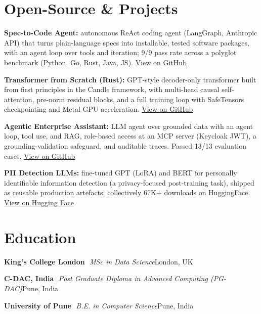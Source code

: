 \documentclass[10pt,a4paper]{article}
\newcommand{\sep}{\,\textcolor{accent!60}{\textbar}\,}
\begin{document}
\section{Open-Source \& Projects}
\begin{tight}
  \item \textbf{Spec-to-Code Agent:} autonomous ReAct coding agent (LangGraph, Anthropic API) that turns plain-language specs into installable, tested software packages, with an agent loop over tools and iteration; 9/9 pass rate across a polyglot benchmark (Python, Go, Rust, Java, JS). \href{https://github.com/abhijeetscode/Spec-to-Code-Agent}{View on GitHub}
  \item \textbf{Transformer from Scratch (Rust):} GPT-style decoder-only transformer built from first principles in the Candle framework, with multi-head causal self-attention, pre-norm residual blocks, and a full training loop with SafeTensors checkpointing and Metal GPU acceleration. \href{https://github.com/abhijeetscode/transformer-rust}{View on GitHub}
  \item \textbf{Agentic Enterprise Assistant:} LLM agent over grounded data with an agent loop, tool use, and RAG, role-based access at an MCP server (Keycloak JWT), a grounding-validation safeguard, and auditable traces. Passed 13/13 evaluation cases. \href{https://github.com/abhijeetscode/Agentic-Enterprise-Assistant}{View on GitHub}
  \item \textbf{PII Detection LLMs:} fine-tuned GPT (LoRA) and BERT for personally identifiable information detection (a privacy-focused post-training task), shipped as reusable production artefacts; collectively 67K+ downloads on HuggingFace. \href{https://huggingface.co/ab-ai/pii_model}{View on Hugging Face}
\end{tight}

\section{Education}
{\color{company}\bfseries King's College London} \sep {\itshape MSc in Data Science}\hfill {\color{muted}London, UK}\par\vspace{1pt}
{\color{company}\bfseries C-DAC, India} \sep {\itshape Post Graduate Diploma in Advanced Computing (PG-DAC)}\hfill {\color{muted}Pune, India}\par\vspace{1pt}
{\color{company}\bfseries University of Pune} \sep {\itshape B.E. in Computer Science}\hfill {\color{muted}Pune, India}\par
\end{document}
